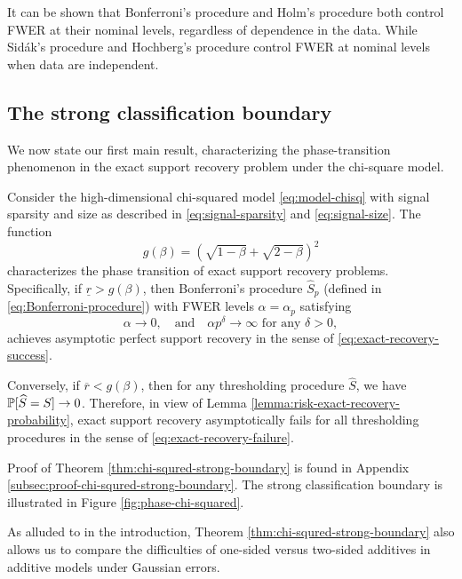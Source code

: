 It can be shown that Bonferroni's procedure and Holm's procedure both control FWER at their nominal levels, regardless of dependence in the data.
While Sid\'ak's procedure and Hochberg's procedure control FWER at nominal levels when data are independent.

\subsection{The strong classification boundary}
\label{subsec:strong-classification-boundary}

We now state our first main result, characterizing the phase-transition phenomenon in the exact support recovery problem under the chi-square model.

\begin{theorem} \label{thm:chi-squred-strong-boundary}
Consider the high-dimensional chi-squared model \eqref{eq:model-chisq} with signal sparsity and size as described in \eqref{eq:signal-sparsity} and \eqref{eq:signal-size}.
The function 
\begin{equation} \label{eq:strong-classification-boundary-chisquared}
    g(\beta) = \left(\sqrt{1-\beta} + \sqrt{2-\beta}\right)^2
\end{equation}
characterizes the phase transition of exact support recovery problems.
Specifically, if $\underline{r} > {{g}}(\beta)$, then Bonferroni's procedure $\widehat{S}_p$ (defined in \eqref{eq:Bonferroni-procedure}) with FWER levels $\alpha=\alpha_p$ satisfying
\begin{equation} \label{eq:FWER-rate-to-zero}
    \alpha\to 0,\quad \text{and} \quad \alpha p^\delta\to\infty \text{  for any } \delta>0,
\end{equation}
achieves asymptotic perfect support recovery in the sense of \eqref{eq:exact-recovery-success}. 

Conversely, if $\overline{r} < {{g}}(\beta)$, then for any thresholding procedure $\widehat{S}$, we have $\P[\widehat{S}=S]\to0$.
Therefore, in view of Lemma \ref{lemma:risk-exact-recovery-probability}, exact support recovery asymptotically fails for all thresholding procedures in the sense of \eqref{eq:exact-recovery-failure}.
\end{theorem}

Proof of Theorem \ref{thm:chi-squred-strong-boundary} is found in Appendix \ref{subsec:proof-chi-squred-strong-boundary}. 
The strong classification boundary is illustrated in Figure \ref{fig:phase-chi-squared}.

As alluded to in the introduction, Theorem \ref{thm:chi-squred-strong-boundary} also allows us to compare the difficulties of one-sided versus two-sided additives in additive models under Gaussian errors.

